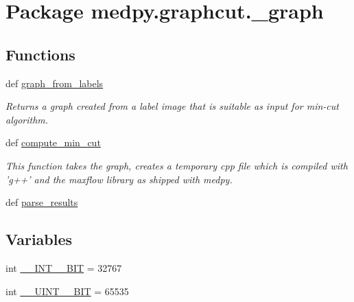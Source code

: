 \hypertarget{namespacemedpy_1_1graphcut_1_1__graph}{
\section{Package medpy.graphcut.\_\-graph}
\label{namespacemedpy_1_1graphcut_1_1__graph}
}
\subsection*{Functions}
\begin{DoxyCompactItemize}
\item 
def \hyperlink{namespacemedpy_1_1graphcut_1_1__graph_ac3f4968888c0ab35e7789b816f4fd435}{graph\_\-from\_\-labels}
\begin{DoxyCompactList}\small\item\em Returns a graph created from a label image that is suitable as input for min-\/cut algorithm. \end{DoxyCompactList}\item 
def \hyperlink{namespacemedpy_1_1graphcut_1_1__graph_aa45ff458ff4e3afc46c5f268bf8c0494}{compute\_\-min\_\-cut}
\begin{DoxyCompactList}\small\item\em This function takes the graph, creates a temporary cpp file which is compiled with 'g++' and the maxflow library as shipped with medpy. \end{DoxyCompactList}\item 
def \hyperlink{namespacemedpy_1_1graphcut_1_1__graph_a83131846a657a495df7ada7de7883bc2}{parse\_\-results}
\end{DoxyCompactItemize}
\subsection*{Variables}
\begin{DoxyCompactItemize}
\item 
int \hyperlink{namespacemedpy_1_1graphcut_1_1__graph_a0af7a7f216a3ea4055de023fb1c0eeee}{\_\-\_\-INT\_\_\-BIT} = 32767
\item 
int \hyperlink{namespacemedpy_1_1graphcut_1_1__graph_ac21489b41ad253ea1243f8aba21753df}{\_\-\_\-UINT\_\_\-BIT} = 65535
\end{DoxyCompactItemize}


